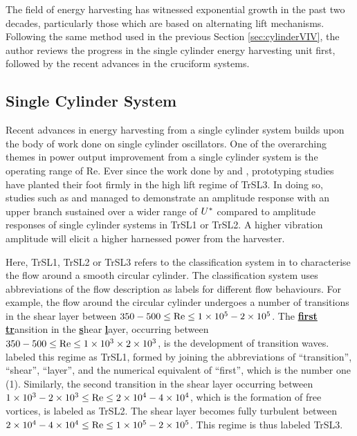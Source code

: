 \documentclass[oneside]{utmthesis}
\begin{document}
\vspace{\baselineskip}

The field of energy harvesting has witnessed exponential growth in the past two decades, particularly those which are based on alternating lift mechanisms. Following the same method used in the previous Section \ref{sec:cylinderVIV}, the author reviews the progress in the single cylinder energy harvesting unit first, followed by the recent advances in the cruciform systems.

\subsection{Single Cylinder System} \label{ssec:singleCylinderHarvester}
Recent advances in energy harvesting from a single cylinder system builds upon the body of work done on single cylinder oscillators. One of the overarching themes in power output improvement from a single cylinder system is the operating range of Re. Ever since the work done by \citet{Bernitsas2008a} and \citet{Bernitsas2009}, prototyping studies have planted their foot firmly in the high lift regime of TrSL3. In doing so, studies such as \citet{Ding2019} and \citet{Park2017} managed to demonstrate an amplitude response with an upper branch sustained over a wider range of $U^{*}$ compared to amplitude responses of single cylinder systems in TrSL1 or TrSL2. A higher vibration amplitude will elicit a higher harnessed power from the harvester.

Here, TrSL1, TrSL2 or TrSL3 refers to the classification system in \citet{Zdravkovich1997} to characterise the flow around a smooth circular cylinder. The classification system uses abbreviations of the flow description as labels for different flow behaviours. For example, the flow around the circular cylinder undergoes a number of transitions in the shear layer between $350 - 500 \leq \text{Re} \leq 1 \times 10^{5} - 2 \times 10^{5}$. The \underline{\textbf{first}} \underline{\textbf{tr}}ansition in the \underline{\textbf{s}}hear \underline{\textbf{l}}ayer, occurring between $350 - 500 \leq \text{Re} \leq 1 \times 10^{3} \times 2 \times 10^{3}$, is the development of transition waves. \citet{Zdravkovich1997} labeled this regime as TrSL1, formed by joining the abbreviations of ``transition'', ``shear'', ``layer'', and the numerical equivalent of ``first'', which is the number one (1). Similarly, the second transition in the shear layer occurring between $1 \times 10^{3} - 2 \times 10^{3} \leq \text{Re} \leq 2 \times 10^{4} - 4 \times 10^{4}$, which is the formation of free vortices, is labeled as TrSL2. The shear layer becomes fully turbulent between $2 \times 10^{4} - 4 \times 10^{4} \leq \text{Re} \leq 1 \times 10^{5} - 2 \times 10^{5}$. This regime is thus labeled TrSL3. 
\end{document}
